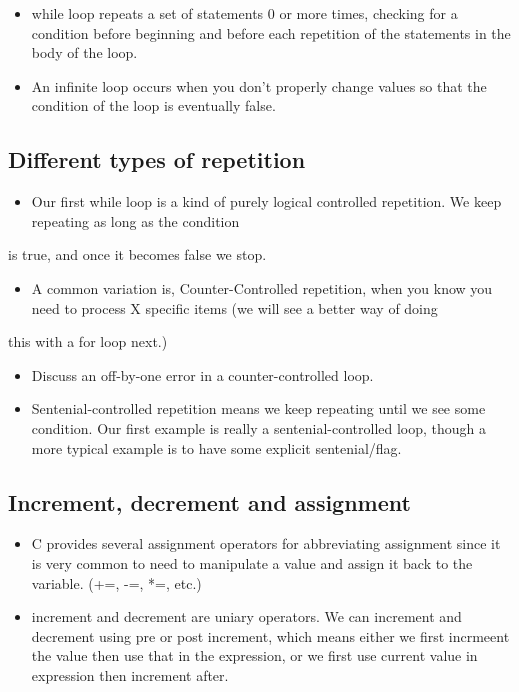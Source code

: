 \documentclass[11pt]{article}
\begin{document}
\begin{itemize}
\item while loop repeats a set of statements 0 or more times, checking for
  a condition before beginning and before each repetition of the
  statements in the body of the loop.
\item An infinite loop occurs when you don't properly change values so
  that the condition of the loop is eventually false.
\end{itemize}
\subsection{Different types of repetition}
\label{sec-2-5}

\begin{itemize}
\item Our first while loop is a kind of purely logical controlled repetition.  We keep repeating as long as the condition
\end{itemize}
is true, and once it becomes false we stop.
\begin{itemize}
\item A common variation is, Counter-Controlled repetition, when you know you need to process X specific items (we will see a better way of doing
\end{itemize}
this with a for loop next.)
\begin{itemize}
\item Discuss an off-by-one error in a counter-controlled loop.
\item Sentenial-controlled repetition means we keep repeating until we see
  some condition.  Our first example is really a sentenial-controlled
  loop, though a more typical example is to have some explicit
  sentenial/flag.
\end{itemize}
\subsection{Increment, decrement and assignment}
\label{sec-2-6}

\begin{itemize}
\item C provides several assignment operators for abbreviating
  assignment since it is very common to need to manipulate a value and
  assign it back to the variable. (+=, -=, *=, etc.)
\item increment and decrement are uniary operators.  We can increment and
  decrement using pre or post increment, which means either we first
  incrmeent the value then use that in the expression, or we first use
  current value in expression then increment after.
\end{itemize}
\end{document}
